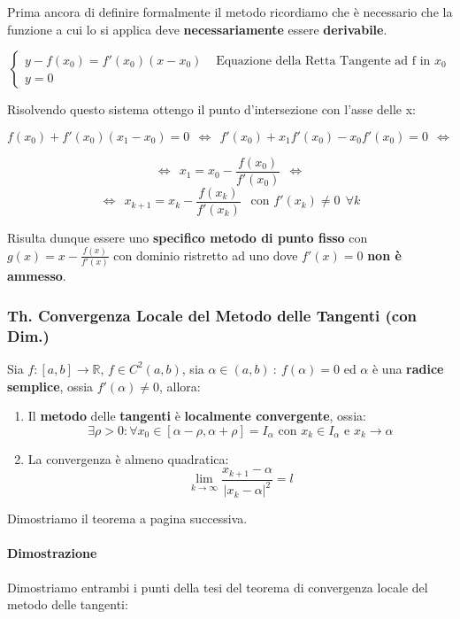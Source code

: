 \documentclass{article}
\begin{document}
Prima ancora di definire formalmente il metodo ricordiamo che è necessario che la funzione a cui lo si applica deve \textbf{necessariamente} essere \textbf{derivabile}.

\[
\left\{
\begin{array}{ll}
    y - f(x_{0}) = f'(x_{0})(x-x_{0}) & \text{ Equazione della Retta Tangente ad f in } x_{0} \\
    y = 0 & 
\end{array}
\right.
\]

Risolvendo questo sistema ottengo il punto d'intersezione con l'asse delle x:

\[ f(x_{0}) + f'(x_{0})(x_{1} - x_{0}) = 0 \:\: \Leftrightarrow \:\: f'(x_{0}) + x_{1}f'(x_{0}) - x_{0}f'(x_{0}) = 0 \:\: \Leftrightarrow\]

\[ \Leftrightarrow \:\: x_{1} = x_{0} - \frac{f(x_{0})}{f'(x_{0})} \:\: \Leftrightarrow \]
\[ \Leftrightarrow \:\: \boxed{x_{k+1} = x_{k} - \frac{f(x_{k})}{f'(x_{k})} }\:\: \text{ con } f'(x_{k}) \neq 0 \:\: \forall k \]

Risulta dunque essere uno \textbf{specifico metodo di punto fisso} con $g(x) = x - \frac{f(x)}{f'(x)}$ con dominio ristretto ad uno dove $f'(x) = 0$ \textbf{non è ammesso}.

\subsubsection{Th. Convergenza Locale del Metodo delle Tangenti (con Dim.)}

Sia $f:[a,b] \rightarrow \mathbb{R}$, $f \in C^{2}(a,b)$, sia $\alpha \in (a,b) \::\: f(\alpha) = 0$ ed $\alpha$ è una \textbf{radice semplice}, ossia 
$f'(\alpha) \neq 0$, allora:

\begin{enumerate}
    \item Il \textbf{metodo} delle \textbf{tangenti} è \textbf{localmente convergente}, ossia:
    \[ \exists \rho > 0: \forall x_{0} \in [\alpha-\rho, \alpha+\rho] = I_{\alpha} \text{ con } x_{k} \in I_{\alpha} \text{ e } x_{k} \rightarrow \alpha \]
    \item La convergenza è almeno quadratica:
    \[ \lim_{k \rightarrow \infty} \frac{x_{k+1} - \alpha}{|x_{k} - \alpha |^{2}} = l \]
\end{enumerate}

Dimostriamo il teorema a pagina successiva.

\newpage

\paragraph{Dimostrazione} Dimostriamo entrambi i punti della tesi del teorema di convergenza locale del metodo delle tangenti:
\end{document}
